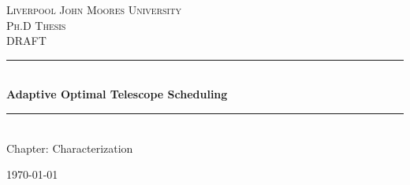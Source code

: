 \documentclass[12pt,a4paper]{article}
\newcommand{\HRule}{\rule{\linewidth}{0.5mm}}
\numberwithin{figure}{section}
\numberwithin{table}{section}
\numberwithin{algorithm}{section}
\begin{document}
\setlength{\parindent}{5mm}
\setlength{\parskip}{10pt plus2mm minus2mm}
\thispagestyle{empty}

\begin{titlepage}
 
\begin{center}
 
\textsc{\LARGE Liverpool John Moores University}\\[1.5cm]
 
\textsc{\Large Ph.D Thesis}\\[0.5cm]
\textsc{\large DRAFT}\\[0.5cm]
 
\HRule \\[0.4cm]
{ \Large \bfseries Adaptive Optimal Telescope Scheduling}\\[0.4cm]
 
\HRule \\[1.5cm]
 
{ \large Chapter: Characterization}
 
\vfill
 
{\large \today}
 
\end{center}
 
\end{titlepage}


\end{document}
